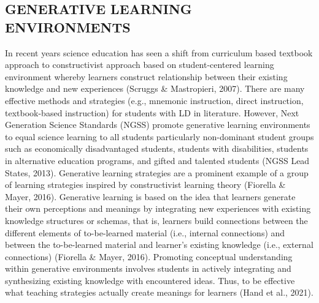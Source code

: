 \documentclass[11.5pt]{sig-alternate} %
\begin{document}
\begin{large}
\section*{GENERATIVE LEARNING ENVIRONMENTS}
In recent years science education has seen a shift from curriculum based textbook approach to constructivist approach based on student-centered learning environment whereby learners construct relationship between their existing knowledge and new experiences (Scruggs \& Mastropieri, 2007). There are many effective methods and strategies (e.g., mnemonic instruction, direct instruction, textbook-based instruction) for students with LD in literature. However, Next Generation Science Standards (NGSS) promote generative learning environments to equal science learning to all students particularly non-dominant student groups such as economically disadvantaged students, students with disabilities, students in alternative education programs, and gifted and talented students (NGSS Lead States, 2013). Generative learning strategies are a prominent example of a group of learning strategies inspired by constructivist learning theory (Fiorella \& Mayer, 2016). Generative learning is based on the idea that learners generate their own perceptions and meanings by integrating new experiences with existing knowledge structures or schemas, that is, learners build connections between the different elements of to-be-learned material (i.e., internal connections) and between the to-be-learned material and learner’s existing knowledge (i.e., external connections) (Fiorella \& Mayer, 2016). Promoting conceptual understanding within generative environments involves students in actively integrating and synthesizing existing knowledge with encountered ideas. Thus, to be effective what teaching strategies actually create meanings for learners (Hand et al., 2021).


\end{large}
\end{document}
